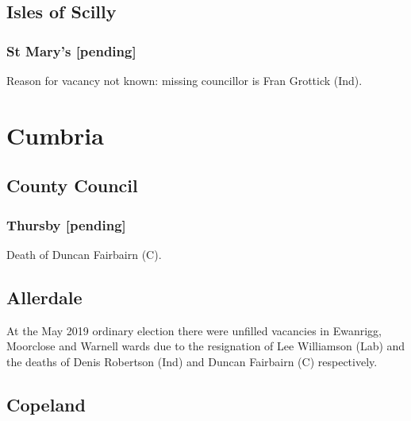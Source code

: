 \documentclass[a4paper,openany]{book}
\begin{document}
\begin{resultsiii}
\subsection*{Isles of Scilly}

\subsubsection*{St Mary's \hspace*{\fill}\nolinebreak[1]%
	\enspace\hspace*{\fill}
	[pending]}


Reason for vacancy not known: missing councillor is Fran Grottick (Ind).

\section{Cumbria}

\subsection*{County Council}

\subsubsection*{Thursby \hspace*{\fill}\nolinebreak[1]%
	\enspace\hspace*{\fill}
	[pending]}


Death of Duncan Fairbairn (C).

\subsection*{Allerdale}

At the May 2019 ordinary election there were unfilled vacancies in Ewanrigg, Moorclose and Warnell wards due to the resignation of Lee Williamson (Lab) and the deaths of Denis Robertson (Ind) and Duncan Fairbairn (C) respectively.

\subsection*{Copeland}


\end{resultsiii}
\end{document}
